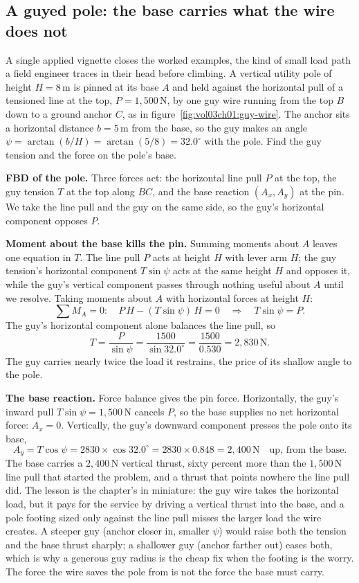 \subsection{A guyed pole: the base carries what the wire does not}



A single applied vignette closes the worked examples, the kind of small
load path a field engineer traces in their head before climbing. A vertical
utility pole of height $H = 8\,\si{\meter}$ is pinned at its base $A$ and
held against the horizontal pull of a tensioned line at the top, $P =
1{,}500\,\text{N}$, by one guy wire running from the top $B$ down to a
ground anchor $C$, as in figure~\ref{fig:vol03ch01:guy-wire}. The anchor
sits a horizontal distance $b = 5\,\si{\meter}$ from the base, so the guy
makes an angle $\psi = \arctan(b/H) = \arctan(5/8) = 32.0^{\circ}$ with the
pole. Find the guy tension and the force on the pole's base.

\textbf{FBD of the pole.} Three forces act: the horizontal line pull $P$ at
the top, the guy tension $T$ at the top along $BC$, and the base reaction
$(A_x, A_y)$ at the pin. We take the line pull and the guy on the same side,
so the guy's horizontal component opposes $P$.

\textbf{Moment about the base kills the pin.} Summing moments about $A$
leaves one equation in $T$. The line pull $P$ acts at height $H$ with lever
arm $H$; the guy tension's horizontal component $T\sin\psi$ acts at the same
height $H$ and opposes it, while the guy's vertical component passes through
nothing useful about $A$ until we resolve. Taking moments about $A$ with
horizontal forces at height $H$:
\[
\sum M_A = 0: \quad P\,H - (T\sin\psi)\,H = 0
\quad\Longrightarrow\quad
T\sin\psi = P.
\]
The guy's horizontal component alone balances the line pull, so
\[
T = \frac{P}{\sin\psi} = \frac{1500}{\sin 32.0^{\circ}}
= \frac{1500}{0.530} = 2{,}830\,\text{N}.
\]
The guy carries nearly twice the load it restrains, the price of its
shallow angle to the pole.

\textbf{The base reaction.} Force balance gives the pin force. Horizontally,
the guy's inward pull $T\sin\psi = 1{,}500\,\text{N}$ cancels $P$, so the
base supplies no net horizontal force: $A_x = 0$. Vertically, the guy's
downward component presses the pole onto its base,
\[
A_y = T\cos\psi = 2830 \times \cos 32.0^{\circ}
= 2830 \times 0.848 = 2{,}400\,\text{N} \quad\text{up, from the base.}
\]
The base carries a $2{,}400\,\text{N}$ vertical thrust, sixty percent more
than the $1{,}500\,\text{N}$ line pull that started the problem, and a
thrust that points nowhere the line pull did. The lesson is the chapter's
in miniature: the guy wire takes the horizontal load, but it pays for the
service by driving a vertical thrust into the base, and a pole footing sized
only against the line pull misses the larger load the wire creates. A
steeper guy (anchor closer in, smaller $\psi$) would raise both the tension
and the base thrust sharply; a shallower guy (anchor farther out) eases
both, which is why a generous guy radius is the cheap fix when the footing
is the worry. The force the wire saves the pole from is not the force the
base must carry.

